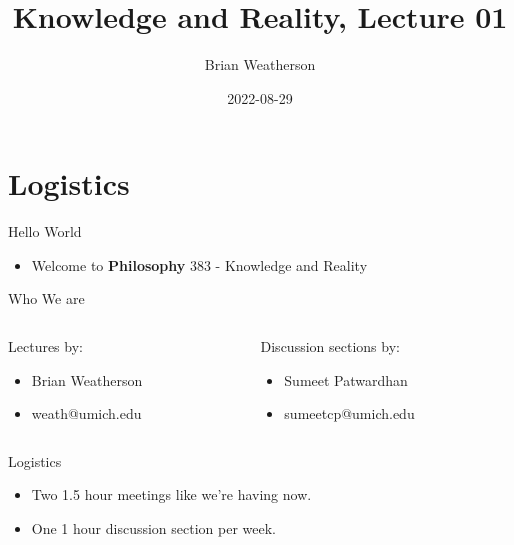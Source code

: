 \documentclass[
  17pt,
  letterpaper,
  ignorenonframetext,
  aspectratio=169,
]{beamer}
\title{Knowledge and Reality, Lecture 01}
\author{Brian Weatherson}
\date{2022-08-29}
\providecommand{\tightlist}{%
  \setlength{\itemsep}{0pt}\setlength{\parskip}{0pt}}\usepackage{longtable,booktabs,array}
\begin{document}
\frame{\titlepage}
\ifdefined\Shaded\renewenvironment{Shaded}{\begin{tcolorbox}[boxrule=0pt, sharp corners, interior hidden, borderline west={3pt}{0pt}{shadecolor}, frame hidden, enhanced, breakable]}{\end{tcolorbox}}\fi

\hypertarget{logistics}{%
\section{Logistics}\label{logistics}}

\begin{frame}{Hello World}
\protect\hypertarget{hello-world}{}
\begin{itemize}[<+->]
\tightlist
\item
  Welcome to \textbf{Philosophy} 383 - Knowledge and Reality
\end{itemize}
\end{frame}

\begin{frame}{Who We are}
\protect\hypertarget{who-we-are}{}
\begin{columns}[T]
\begin{column}{0.48\textwidth}
Lectures by:

\begin{itemize}[<+->]
\tightlist
\item
  Brian Weatherson
\item
  weath@umich.edu
\end{itemize}
\end{column}

\begin{column}{0.48\textwidth}
Discussion sections by:

\begin{itemize}[<+->]
\tightlist
\item
  Sumeet Patwardhan
\item
  sumeetcp@umich.edu
\end{itemize}
\end{column}
\end{columns}
\end{frame}

\begin{frame}{Logistics}
\protect\hypertarget{logistics-1}{}
\begin{itemize}[<+->]
\tightlist
\item
  Two 1.5 hour meetings like we're having now.
\item
  One 1 hour discussion section per week.
\end{itemize}
\end{frame}
\end{document}

